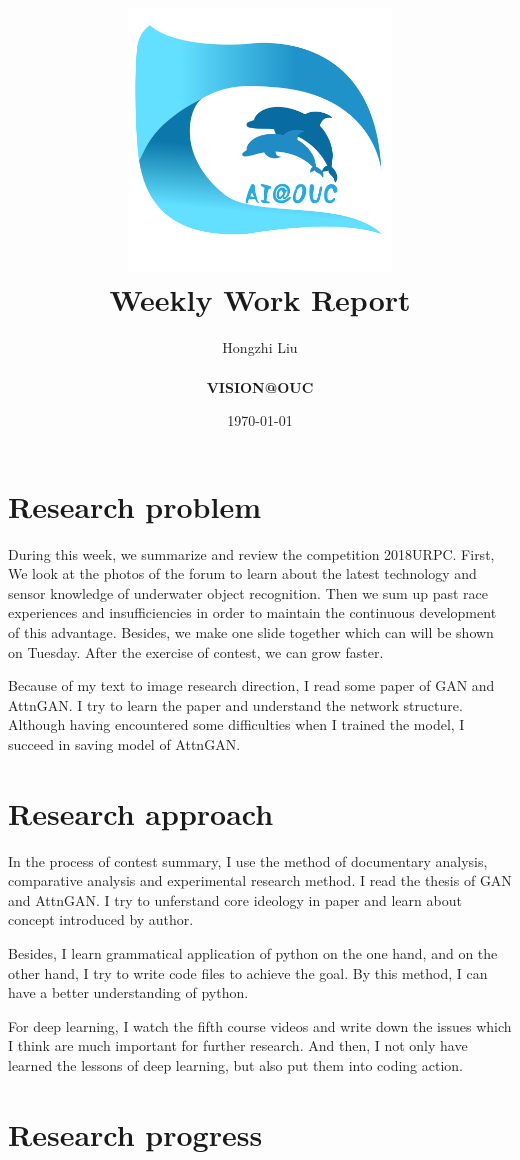 \documentclass[a4paper]{article}
\title{
	\vspace*{1in}
	\includegraphics[width=2.75in]{figures/zhenglab-logo} \\
	\vspace*{1.2in}
	\textbf{\huge Weekly Work Report}
	\vspace{0.2in}
}
\author{Hongzhi Liu \\
	\vspace*{0.5in} \\
	\textbf{VISION@OUC} \\
	\vspace*{1in}
}
\date{\today}
\begin{document}
	\par
	\maketitle
	\setcounter{page}{0}
	\thispagestyle{empty}
	
	\newpage
	
	\section{Research problem}
	
	During this week, we summarize and review the competition 2018URPC. First, We look at the photos of the forum to learn about the latest technology and sensor knowledge of underwater object recognition. Then we sum up past race experiences and insufficiencies in order to maintain the continuous development of this advantage. Besides, we make one slide together which can will be shown on Tuesday. After the exercise of contest, we can grow faster.
	
	Because of my text to image research direction, I read some paper of GAN and AttnGAN. I try to learn the paper and understand the network structure. Although having encountered some difficulties when I trained the model, I succeed in saving model of AttnGAN.
		
		
	\section{Research approach}
	
	In the process of contest summary, I use the method of documentary analysis, comparative analysis and experimental research method. I read the thesis of GAN\cite{Goodfellow2014Generative} and AttnGAN\cite{Tao18attngan}. I try to unferstand core ideology in paper and learn about concept introduced by author.
	
	Besides, I learn grammatical application of python on the one hand, and on the other hand, I try to write code files to achieve the goal. By this method, I can have a better understanding of python.
	
	For deep learning, I watch the fifth course videos and write down the issues which I think are much important for further research. And then, I not only have learned the lessons of deep learning, but also put them into coding action. 
	
	
	\section{Research progress}
	
\end{document}
